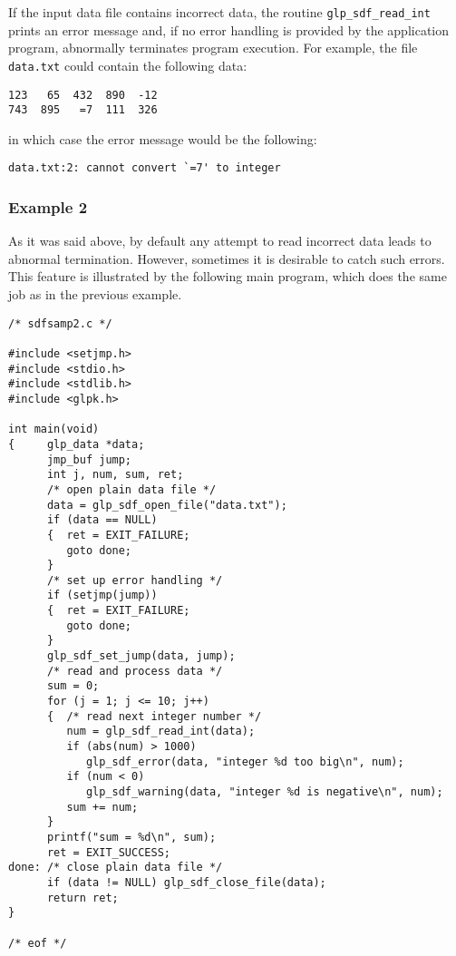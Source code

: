 \noindent
If the input data file contains incorrect data, the routine
\verb|glp_sdf_read_int| prints an error message and, if no error
handling is provided by the application program, abnormally terminates
program execution. For example, the file \verb|data.txt| could contain
the following data:

\begin{footnotesize}
\begin{verbatim}
123   65  432  890  -12
743  895   =7  111  326
\end{verbatim}
\end{footnotesize}

\noindent
in which case the error message would be the following:

\begin{footnotesize}
\begin{verbatim}
data.txt:2: cannot convert `=7' to integer
\end{verbatim}
\end{footnotesize}

\subsubsection*{Example 2}

As it was said above, by default any attempt to read incorrect data
leads to abnormal termination. However, sometimes it is desirable to
catch such errors. This feature is illustrated by the following main
program, which does the same job as in the previous example.

\begin{footnotesize}
\begin{verbatim}
/* sdfsamp2.c */

#include <setjmp.h>
#include <stdio.h>
#include <stdlib.h>
#include <glpk.h>

int main(void)
{     glp_data *data;
      jmp_buf jump;
      int j, num, sum, ret;
      /* open plain data file */
      data = glp_sdf_open_file("data.txt");
      if (data == NULL)
      {  ret = EXIT_FAILURE;
         goto done;
      }
      /* set up error handling */
      if (setjmp(jump))
      {  ret = EXIT_FAILURE;
         goto done;
      }
      glp_sdf_set_jump(data, jump);
      /* read and process data */
      sum = 0;
      for (j = 1; j <= 10; j++)
      {  /* read next integer number */
         num = glp_sdf_read_int(data);
         if (abs(num) > 1000)
            glp_sdf_error(data, "integer %d too big\n", num);
         if (num < 0)
            glp_sdf_warning(data, "integer %d is negative\n", num);
         sum += num;
      }
      printf("sum = %d\n", sum);
      ret = EXIT_SUCCESS;
done: /* close plain data file */
      if (data != NULL) glp_sdf_close_file(data);
      return ret;
}

/* eof */
\end{verbatim}
\end{footnotesize}

